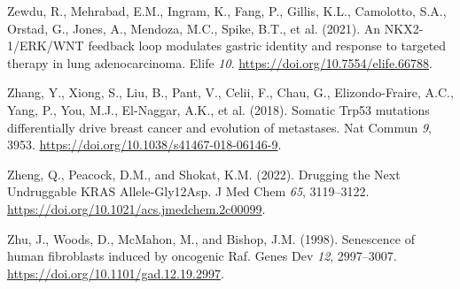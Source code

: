 \begin{CSLReferences}{0}{0}
\leavevmode{}%
Zewdu, R., Mehrabad, E.M., Ingram, K., Fang, P., Gillis, K.L., Camolotto, S.A., Orstad, G., Jones, A., Mendoza, M.C., Spike, B.T., et al. (2021). An NKX2-1/ERK/WNT feedback loop modulates gastric identity and response to targeted therapy in lung adenocarcinoma. Elife \emph{10}. \url{https://doi.org/10.7554/elife.66788}.

\leavevmode{}%
Zhang, Y., Xiong, S., Liu, B., Pant, V., Celii, F., Chau, G., Elizondo-Fraire, A.C., Yang, P., You, M.J., El-Naggar, A.K., et al. (2018). Somatic Trp53 mutations differentially drive breast cancer and evolution of metastases. Nat Commun \emph{9}, 3953. \url{https://doi.org/10.1038/s41467-018-06146-9}.

\leavevmode{}%
Zheng, Q., Peacock, D.M., and Shokat, K.M. (2022). Drugging the Next Undruggable KRAS Allele-Gly12Asp. J Med Chem \emph{65}, 3119--3122. \url{https://doi.org/10.1021/acs.jmedchem.2c00099}.

\leavevmode{}%
Zhu, J., Woods, D., McMahon, M., and Bishop, J.M. (1998). Senescence of human fibroblasts induced by oncogenic Raf. Genes Dev \emph{12}, 2997--3007. \url{https://doi.org/10.1101/gad.12.19.2997}.

\end{CSLReferences}
